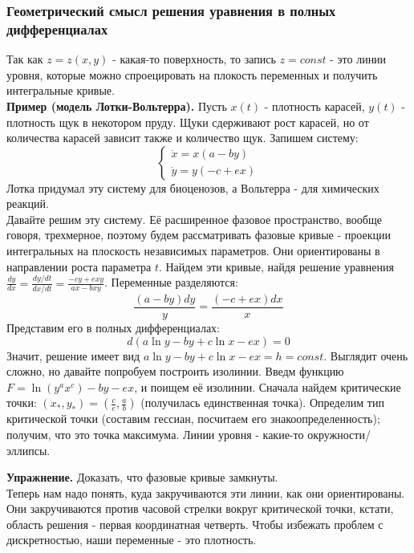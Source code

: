\subsubsection{Геометрический смысл решения уравнения в полных дифференциалах}
Так как $z=z(x,y)$ - какая-то поверхность, то запись  $z=const$ - это линии
уровня, которые можно спроецировать на плокость переменных и получить 
интегральные кривые.\\
\textbf{Пример (модель Лотки-Вольтерра).} Пусть $x(t)$ - плотность карасей,
 $y(t)$ - плотность щук в некотором пруду. Щуки сдерживают рост карасей,
но от количества карасей зависит также и количество щук. Запишем систему:
$$\begin{cases} \label{lotka_volterra}
    \dot{x}=x(a-by)\\
    \dot{y}=y(-c+ex)
\end{cases}$$
Лотка придумал эту систему для биоценозов, а Вольтерра - для химических
реакций.\\
Давайте решим эту систему. Её расширенное фазовое пространство, вообще говоря,
трехмерное, поэтому будем рассматривать фазовые кривые - проекции интегральных 
на плоскость независимых параметров. Они ориентированы в направлении роста
параметра $t$. Найдем эти кривые, найдя решение уравнения 
$\frac{dy}{dx}=\frac{dy /dt}{dx /dt}=\frac{-cy+exy}{ax-bxy}$. 
Переменные разделяются: $$\frac{(a-by)dy}{y}=\frac{(-c+ex)dx}{x}$$ 
Представим его в полных дифференциалах: 
$$d\left( a\ln y-by+c\ln x -ex \right)=0$$
Значит, решение имеет вид $a\ln y-by+c\ln x-ex=h=const$.
Выглядит очень сложно, но давайте попробуем построить изолинии. 
Введм функцию $F=\ln{(y^ax^c)}-by-ex$, и поищем её изолинии. Сначала найдем
критические точки: $(x_*,y_*)=(\frac{c}{e},\frac{a}{b})$ (получилась 
единственная точка). Определим тип критической точки (составим гессиан, 
посчитаем его знакоопределенность); получим, что это точка максимума.
Линии уровня - какие-то окружности/эллипсы.\\
\begin{figure}[h]
    
\end{figure}
\textbf{Упражнение.} Доказать, что фазовые кривые замкнуты.\\
Теперь нам надо понять, куда закручиваются эти линии, как они ориентированы.
Они закручиваются против часовой стрелки вокруг критической точки, кстати,
область решения - первая координатная четверть. Чтобы избежать проблем с 
дискретностью, наши переменные - это плотность. 

 



